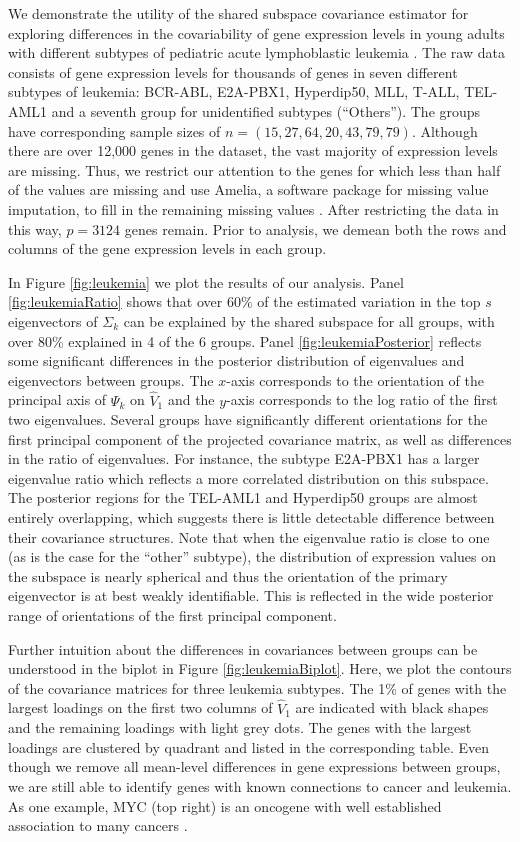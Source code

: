 \documentclass[12pt]{article}
\begin{document}
We demonstrate the utility of the shared subspace covariance
estimator for exploring differences in the covariability of gene
expression levels in young adults with different subtypes of pediatric
acute lymphoblastic leukemia \citep{Yeoh2002}.  The raw data consists
of gene expression levels for thousands of genes in seven different
subtypes of leukemia: BCR-ABL, E2A-PBX1, Hyperdip50, MLL, T-ALL,
TEL-AML1 and a seventh group for unidentified subtypes (``Others'').  The groups
have corresponding sample sizes of $n = (15, 27, 64, 20, 43, 79, 79)$.
Although there are over 12,000 genes in the dataset, the vast majority of expression
levels are missing.  Thus, we restrict our attention to the genes for
which less than half of the values are missing and use Amelia, a
software package for missing value imputation, to fill in the
remaining missing values \citep{Amelia}.  After restricting the data
in this way, $p=3124$ genes remain.  Prior to analysis, we demean both
the rows and columns of the gene expression levels in each group.

In Figure \ref{fig:leukemia} we plot the results of our analysis.
Panel \ref{fig:leukemiaRatio} shows that over $60\%$ of the estimated
variation in the top $s$ eigenvectors of $\Sigma_k$ can be explained
by the shared subspace for all groups, with over 80\% explained in 4
of the 6 groups.  Panel \ref{fig:leukemiaPosterior} reflects some
significant differences in the posterior distribution of eigenvalues
and eigenvectors between groups.  The $x$-axis corresponds to the
orientation of the principal axis of $\Psi_k$ on $\hat{V}_1$ and the
$y$-axis corresponds to the log ratio of the first two eigenvalues.
Several groups have significantly different orientations for the first
principal component of the projected covariance matrix, as well as
differences in the ratio of eigenvalues.  For instance, the subtype
E2A-PBX1 has a larger eigenvalue ratio which reflects a more
correlated distribution on this subspace.  The posterior regions for
the TEL-AML1 and Hyperdip50 groups are almost entirely overlapping,
which suggests there is little detectable difference between their
covariance structures.  Note that when the eigenvalue ratio is close
to one (as is the case for the ``other'' subtype), the distribution of
expression values on the subspace is nearly spherical and thus the
orientation of the primary eigenvector is at best weakly identifiable.
This is reflected in the wide posterior range of orientations of the
first principal component.

Further intuition about the differences in covariances between groups
can be understood in the biplot in Figure \ref{fig:leukemiaBiplot}.
Here, we plot the contours of the covariance matrices for three
leukemia subtypes. The 1\% of genes with the largest loadings on the
first two columns of $\hat{V}_1$ are indicated with black shapes and the
remaining loadings with light grey dots.  The genes with the largest
loadings are clustered by quadrant and listed in the corresponding
table.  Even though we remove all mean-level differences in gene
expressions between groups, we are still able to identify genes with
known connections to cancer and leukemia.  As one example, MYC (top
right) is an oncogene with well established association to many
cancers \citep{Dang2012}.
\end{document}
